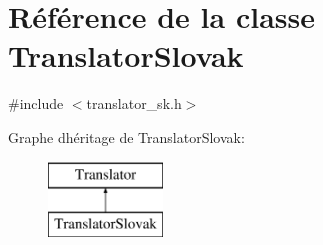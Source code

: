 \hypertarget{class_translator_slovak}{}\section{Référence de la classe Translator\+Slovak}
\label{class_translator_slovak}


{\ttfamily \#include $<$translator\+\_\+sk.\+h$>$}

Graphe d\textquotesingle{}héritage de Translator\+Slovak\+:\begin{figure}[H]
\begin{center}
\leavevmode
\includegraphics[height=2.000000cm]{class_translator_slovak}
\end{center}
\end{figure}
